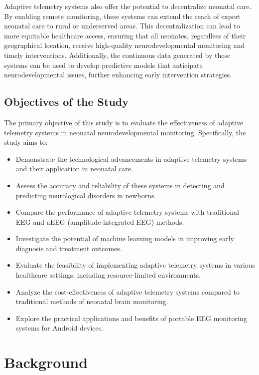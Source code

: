 \documentclass[12pt,journal,compsoc]{IEEEtran}
\begin{document}
Adaptive telemetry systems also offer the potential to decentralize neonatal care. By enabling remote monitoring, these systems can extend the reach of expert neonatal care to rural or underserved areas. This decentralization can lead to more equitable healthcare access, ensuring that all neonates, regardless of their geographical location, receive high-quality neurodevelopmental monitoring and timely interventions. Additionally, the continuous data generated by these systems can be used to develop predictive models that anticipate neurodevelopmental issues, further enhancing early intervention strategies.

\subsection{Objectives of the Study}
The primary objective of this study is to evaluate the effectiveness of adaptive telemetry systems in neonatal neurodevelopmental monitoring. Specifically, the study aims to:
\begin{itemize}
    \item Demonstrate the technological advancements in adaptive telemetry systems and their application in neonatal care.
    \item Assess the accuracy and reliability of these systems in detecting and predicting neurological disorders in newborns.
    \item Compare the performance of adaptive telemetry systems with traditional EEG and aEEG (amplitude-integrated EEG) methods.
    \item Investigate the potential of machine learning models in improving early diagnosis and treatment outcomes.
    \item Evaluate the feasibility of implementing adaptive telemetry systems in various healthcare settings, including resource-limited environments.
    \item Analyze the cost-effectiveness of adaptive telemetry systems compared to traditional methods of neonatal brain monitoring.
    \item Explore the practical applications and benefits of portable EEG monitoring systems for Android devices.
\end{itemize}

\section{Background}
\end{document}
